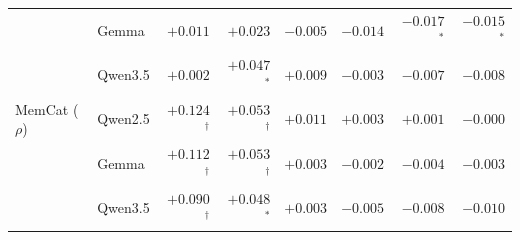\begin{table}[t]
\begin{tabular}{@{}llrrrrrr@{}}
 & Gemma & $+0.011$ & $+0.023$ & $-0.005$ & $-0.014$ & $-0.017$$^{*}$ & $-0.015$$^{*}$ \\
 & Qwen3.5 & $+0.002$ & $+0.047$$^{*}$ & $+0.009$ & $-0.003$ & $-0.007$ & $-0.008$ \\
\addlinespace
MemCat ($\rho$) & Qwen2.5 & $+0.124$$^{\dagger}$ & $+0.053$$^{\dagger}$ & $+0.011$ & $+0.003$ & $+0.001$ & $-0.000$ \\
 & Gemma & $+0.112$$^{\dagger}$ & $+0.053$$^{\dagger}$ & $+0.003$ & $-0.002$ & $-0.004$ & $-0.003$ \\
 & Qwen3.5 & $+0.090$$^{\dagger}$ & $+0.048$$^{*}$ & $+0.003$ & $-0.005$ & $-0.008$ & $-0.010$ \\
\bottomrule
\end{tabular}
\end{table}
